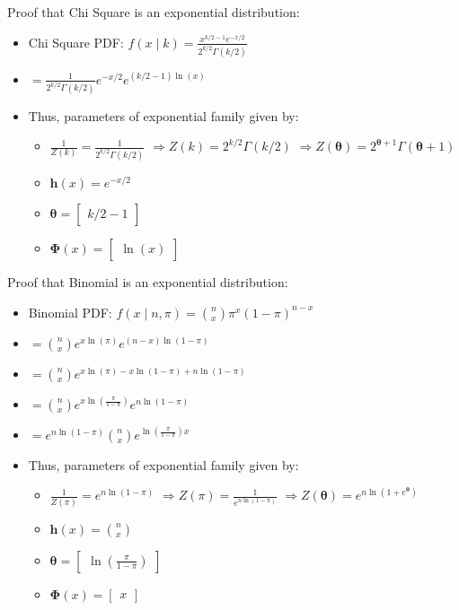 Proof that Chi Square is an exponential distribution:
\begin{itemize}
    \item Chi Square PDF: $
    f(x \mid k) = \frac{x^{k/2 - 1} e^{-x/2}}{2^{k/2} \Gamma(k/2)}
    $
    \item 
    $
    = \frac{1}{2^{k/2}\Gamma(k/2)} e^{- x/2} e^{(k/2 - 1) \ln(x)}
    $
    \item Thus, parameters of exponential family given by:
    \begin{itemize}
        \item $\frac{1}{Z(k)} = \frac{1}{2^{k/2}\Gamma(k/2)}$
        $ \Rightarrow
        Z(k) = 2^{k/2}\Gamma(k/2)
        $
        $ \Rightarrow
        Z(\boldsymbol{\theta}) = 2^{\boldsymbol{\theta} +1}\Gamma(\boldsymbol{\theta} + 1)
        $
        \item $\boldsymbol{h}(x) = e^{- x/2}$
        \item $\boldsymbol{\theta} = \begin{bmatrix}
        k/2 - 1
        \end{bmatrix}$
        \item $
        \boldsymbol{\Phi}(x) = \begin{bmatrix}
        \ln(x)
        \end{bmatrix}
        $
    \end{itemize}
\end{itemize}
Proof that Binomial is an exponential distribution:
\begin{itemize}
    \item Binomial PDF: $
    f(x \mid n, \pi) = \binom{n}{x} \pi^x (1 - \pi)^{n - x}
    $
    \item 
    $
    = \binom{n}{x} e^{x \ln(\pi)}  e^{(n - x) \ln(1 - \pi)}
    $
    \item 
    $
    = \binom{n}{x} e^{x \ln(\pi) - x\ln(1 - \pi) + n\ln(1 - \pi)}
    $
    \item 
    $
    = \binom{n}{x} e^{x \ln(\frac{\pi}{1-\pi})} e^{n\ln(1 - \pi)}
    $
    \item 
    $
    = e^{n\ln(1 - \pi)} \binom{n}{x} e^{\ln(\frac{\pi}{1-\pi}) x}
    $
    \item Thus, parameters of exponential family given by:
    \begin{itemize}
        \item $\frac{1}{Z(\pi)} = e^{n\ln(1 - \pi)}$
        $ \Rightarrow
        Z(\pi) = \frac{1}{e^{n\ln(1 - \pi)}}
        $
        $ \Rightarrow
        Z(\boldsymbol{\theta}) = e^{n\ln(1 + e^{\boldsymbol{\theta}})}
        $
        \item $\boldsymbol{h}(x) = \binom{n}{x}$
        \item $\boldsymbol{\theta} = \begin{bmatrix}
        \ln(\frac{\pi}{1-\pi})
        \end{bmatrix}$
        \item $
        \boldsymbol{\Phi}(x) = \begin{bmatrix}
        x
        \end{bmatrix}
        $
    \end{itemize}
\end{itemize}

